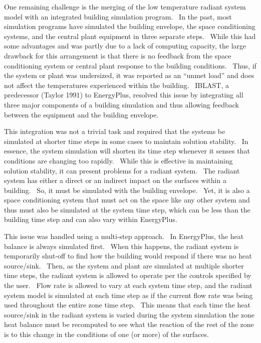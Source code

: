 One remaining challenge is the merging of the low temperature radiant system model with an integrated building simulation program.~ In the past, most simulation programs have simulated the building envelope, the space conditioning systems, and the central plant equipment in three separate steps.~ While this had some advantages and was partly due to a lack of computing capacity, the large drawback for this arrangement is that there is no feedback from the space conditioning system or central plant response to the building conditions.~ Thus, if the system or plant was undersized, it was reported as an ``unmet load'' and does not affect the temperatures experienced within the building.~ IBLAST, a predecessor (Taylor 1991) to EnergyPlus, resolved this issue by integrating all three major components of a building simulation and thus allowing feedback between the equipment and the building envelope.

This integration was not a trivial task and required that the systems be simulated at shorter time steps in some cases to maintain solution stability.~ In essence, the system simulation will shorten its time step whenever it senses that conditions are changing too rapidly.~ While this is effective in maintaining solution stability, it can present problems for a radiant system.~ The radiant system has either a direct or an indirect impact on the surfaces within a building.~ So, it must be simulated with the building envelope.~ Yet, it is also a space conditioning system that must act on the space like any other system and thus must also be simulated at the system time step, which can be less than the building time step and can also vary within EnergyPlus.

This issue was handled using a multi-step approach.~ In EnergyPlus, the heat balance is always simulated first.~ When this happens, the radiant system is temporarily shut-off to find how the building would respond if there was no heat source/sink.~ Then, as the system and plant are simulated at multiple shorter time steps, the radiant system is allowed to operate per the controls specified by the user.~ Flow rate is allowed to vary at each system time step, and the radiant system model is simulated at each time step as if the current flow rate was being used throughout the entire zone time step.~ This means that each time the heat source/sink in the radiant system is varied during the system simulation the zone heat balance must be recomputed to see what the reaction of the rest of the zone is to this change in the conditions of one (or more) of the surfaces.

